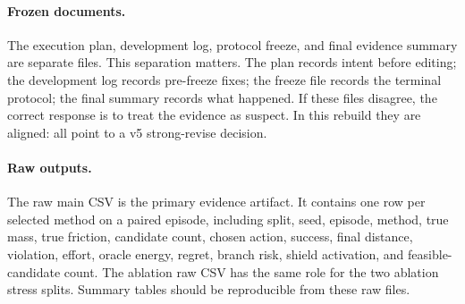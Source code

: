 \documentclass{article}
\begin{document}
\paragraph{Frozen documents.}
The execution plan, development log, protocol freeze, and final evidence summary are separate files.  This separation matters.  The plan records intent before editing; the development log records pre-freeze fixes; the freeze file records the terminal protocol; the final summary records what happened.  If these files disagree, the correct response is to treat the evidence as suspect.  In this rebuild they are aligned: all point to a v5 strong-revise decision.

\paragraph{Raw outputs.}
The raw main CSV is the primary evidence artifact.  It contains one row per selected method on a paired episode, including split, seed, episode, method, true mass, true friction, candidate count, chosen action, success, final distance, violation, effort, oracle energy, regret, branch risk, shield activation, and feasible-candidate count.  The ablation raw CSV has the same role for the two ablation stress splits.  Summary tables should be reproducible from these raw files.
\end{document}
